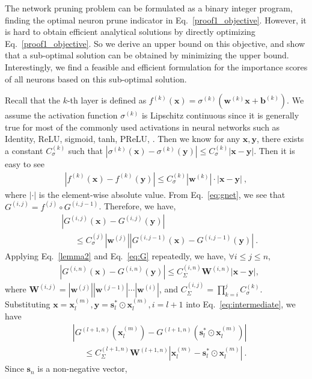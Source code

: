 \documentclass[10pt,twocolumn,letterpaper]{article}
\def\mb{\mathbf}
\begin{document}
The network pruning problem can be formulated as a binary integer program, finding the optimal neuron prune indicator in Eq.~\ref{proof1_objective}. However, it is hard to obtain efficient analytical solutions by directly optimizing Eq.~\ref{proof1_objective}. So we derive an upper bound on this objective, and show that a sub-optimal solution can be obtained by minimizing the upper bound. Interestingly, we find a feasible and efficient formulation for the importance scores of all neurons based on this sub-optimal solution. 

Recall that the $k$-th layer is defined as $f^{(k)}(\mb x)=\sigma^{(k)}(\mb w^{(k)}\mb x+\mb b^{(k)})$. We assume the activation function $\sigma^{(k)}$ is Lipschitz continuous since it is generally true for most of the commonly used activations in neural networks  such as Identity, ReLU, sigmoid, tanh, PReLU, \etc. Then we know for any $\mb x,\mb y$, there exists a constant $C_\sigma^{(k)}$ such that $|\sigma^{(k)}(\mb x)-\sigma^{(k)}(\mb y)|\le C_\sigma^{(k)}|\mb x-\mb y|$.
Then it is easy to see
\begin{align}\label{lemma2}
|f^{(k)}(\mb x)-f^{(k)}(\mb y)|\le C_\sigma^{(k)}|\mb w^{(k)}|\cdot|\mb x-\mb y|~,
\end{align}
where $|\cdot|$ is the element-wise absolute value. From Eq.~\ref{eq:gnet}, we see that $G^{(i,j)}=f^{(j)}\circ G^{(i,j-1)}$. Therefore, we have,
\begin{align}
    &|G^{(i,j)}(\mb x)-G^{(i,j)}(\mb y)|\nonumber\\
    &~~~~~~~\le C_\sigma^{(j)}|\mb w^{(j)}||G^{(i,j-1)}(\mb x)-G^{(i,j-1)}(\mb y)|~.\label{eq:G}
\end{align}
Applying Eq.~\ref{lemma2} and Eq.~\ref{eq:G} repeatedly, we have, $\forall i\le j\le n$,
\begin{align}
   & |G^{(i,n)}(\mb x)-G^{(i,n)}(\mb y)|\le C_\Sigma^{(i,n)}\mb W^{(i,n)}|\mb x-\mb y|,\label{eq:intermediate}
\end{align}
where $\mb W^{(i,j)}=|\mb w^{(j)}||\mb w^{(j-1)}|\cdots|\mb w^{(i)}|$, and  $C_\Sigma^{(i,j)}=\prod_{k=i}^j C_\sigma^{(k)}$.
Substituting $\mb x = \mb x_l^{(m)},\mb y=\mb s^*_l\odot\mb x_l^{(m)},i=l+1$ into Eq.~\ref{eq:intermediate}, we have
\begin{align}
&|G^{(l+1,n)}(\mb x^{(m)}_l)-G^{(l+1,n)}(\mb s^*_l\odot\mb x^{(m)}_l)|\nonumber\\
&~~~~~~\le C_\Sigma^{(l+1,n)}\mb W^{(l+1,n)}|\mb x^{(m)}_l-\mb s^*_l\odot\mb x^{(m)}_l|~.
\end{align}
Since $\mb s_n$ is a non-negative vector,
\end{document}

